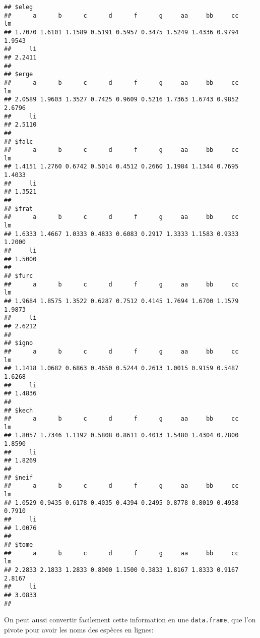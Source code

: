 \begin{knitrout}
\color{fgcolor}\begin{kframe}
\begin{flushleft}
\ttfamily\noindent
{}\hlkeyword{(}\hlkeyword{,}{\ }\hlkeyword{)}\mbox{}
\normalfont
\end{flushleft}
\begin{verbatim}
## $eleg
##      a      b      c      d      f      g     aa     bb     cc     lm 
## 1.7070 1.6101 1.1589 0.5191 0.5957 0.3475 1.5249 1.4336 0.9794 1.9543 
##     li 
## 2.2411 
## 
## $erge
##      a      b      c      d      f      g     aa     bb     cc     lm 
## 2.0589 1.9603 1.3527 0.7425 0.9609 0.5216 1.7363 1.6743 0.9852 2.6796 
##     li 
## 2.5110 
## 
## $falc
##      a      b      c      d      f      g     aa     bb     cc     lm 
## 1.4151 1.2760 0.6742 0.5014 0.4512 0.2660 1.1984 1.1344 0.7695 1.4033 
##     li 
## 1.3521 
## 
## $frat
##      a      b      c      d      f      g     aa     bb     cc     lm 
## 1.6333 1.4667 1.0333 0.4833 0.6083 0.2917 1.3333 1.1583 0.9333 1.2000 
##     li 
## 1.5000 
## 
## $furc
##      a      b      c      d      f      g     aa     bb     cc     lm 
## 1.9684 1.8575 1.3522 0.6287 0.7512 0.4145 1.7694 1.6700 1.1579 1.9873 
##     li 
## 2.6212 
## 
## $igno
##      a      b      c      d      f      g     aa     bb     cc     lm 
## 1.1418 1.0682 0.6863 0.4650 0.5244 0.2613 1.0015 0.9159 0.5487 1.6268 
##     li 
## 1.4836 
## 
## $kech
##      a      b      c      d      f      g     aa     bb     cc     lm 
## 1.8057 1.7346 1.1192 0.5808 0.8611 0.4013 1.5480 1.4304 0.7800 1.8590 
##     li 
## 1.8269 
## 
## $neif
##      a      b      c      d      f      g     aa     bb     cc     lm 
## 1.0529 0.9435 0.6178 0.4035 0.4394 0.2495 0.8778 0.8019 0.4958 0.7910 
##     li 
## 1.0076 
## 
## $tome
##      a      b      c      d      f      g     aa     bb     cc     lm 
## 2.2833 2.1833 1.2833 0.8000 1.1500 0.3833 1.8167 1.8333 0.9167 2.8167 
##     li 
## 3.0833 
## 
\end{verbatim}
\end{kframe}
\end{knitrout}


On peut aussi convertir facilement cette information en une \texttt{data.frame}, que l'on pivote pour avoir les noms des espèces en lignes:

